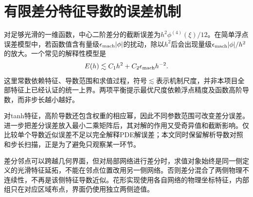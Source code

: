 \section{有限差分特征导数的误差机制}
对足够光滑的一维函数，中心二阶差分的截断误差为$h^2\phi^{(4)}(\xi)/12$。在简单浮点误差模型中，若函数值含有量级$\epsilon_{\rm mach}|\phi|$的扰动，除以$h^2$后会出现量级$\epsilon_{\rm mach}|\phi|/h^2$的放大。一个常见的解释性模型是
\[
E(h)\lesssim C_1h^2+C_2\epsilon_{\rm mach}h^{-2}.
\]
这里常数依赖特征、导数范围和求值过程，符号$\lesssim$表示机制尺度，并非本项目全部特征上已经认证的统一上界。两项平衡提示最优尺度依赖浮点精度及函数高阶导数，而非步长越小越好。

对tanh特征，高阶导数还包含权重的相应幂，因此不同参数范围可改变差分误差。进一步把差分误差放入最小二乘矩阵后，其对解的作用又受奇异值和截断影响。仅比较单个导数近似误差不足以完全解释PDE解误差；本文同时保留解析导数对照和步长扫描，正是为了避免只观察某一环节。

差分邻点可以跨越几何界面，但对局部网络进行差分时，求值对象始终是同一侧定义的光滑特征延拓，不能在邻点位置改用另一侧网络。否则差分混合了两侧物理不连续性，不再是该侧特征导数近似。花形实现使用各自网络的物理坐标特征，内部组只在对应区域布点，界面仍使用独立两侧迹值。
